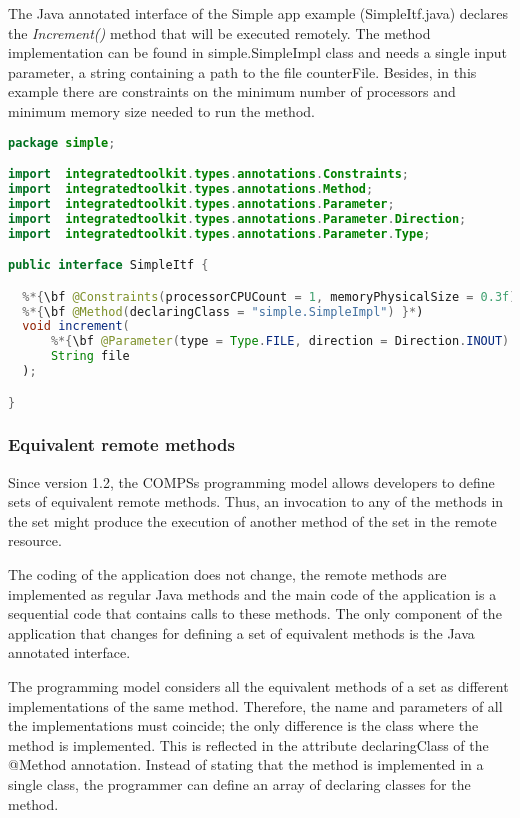 \begin{itemize}
    
The Java annotated interface of the Simple app example (SimpleItf.java) declares the {\it Increment()} method
that will be executed remotely. The method implementation can be found in simple.SimpleImpl class and
needs a single input parameter, a string containing a path to the file counterFile. Besides, in this example
there are constraints on the minimum number of processors and minimum memory size needed to run the
method.

\begin{lstlisting}[language=java]
package simple;

import  integratedtoolkit.types.annotations.Constraints;
import  integratedtoolkit.types.annotations.Method;
import  integratedtoolkit.types.annotations.Parameter;
import  integratedtoolkit.types.annotations.Parameter.Direction;
import  integratedtoolkit.types.annotations.Parameter.Type;

public interface SimpleItf {

  %*{\bf @Constraints(processorCPUCount = 1, memoryPhysicalSize = 0.3f) }*)
  %*{\bf @Method(declaringClass = "simple.SimpleImpl") }*)
  void increment(
      %*{\bf @Parameter(type = Type.FILE, direction = Direction.INOUT) }*)
      String file
  );

}
\end{lstlisting}


\subsubsection{Equivalent remote methods}
Since version 1.2, the COMPSs programming model allows developers to define sets of equivalent remote
methods. Thus, an invocation to any of the methods in the set might produce the execution of another
method of the set in the remote resource.

The coding of the application does not change, the remote methods are implemented as regular Java
methods and the main code of the application is a sequential code that contains calls to these methods. The
only component of the application that changes for defining a set of equivalent methods is the Java
annotated interface.

The programming model considers all the equivalent methods of a set as different implementations of the
same method. Therefore, the name and parameters of all the implementations must coincide; the only
difference is the class where the method is implemented. This is reflected in the attribute declaringClass of
the @Method annotation. Instead of stating that the method is implemented in a single class, the
programmer can define an array of declaring classes for the method.


\end{itemize}
